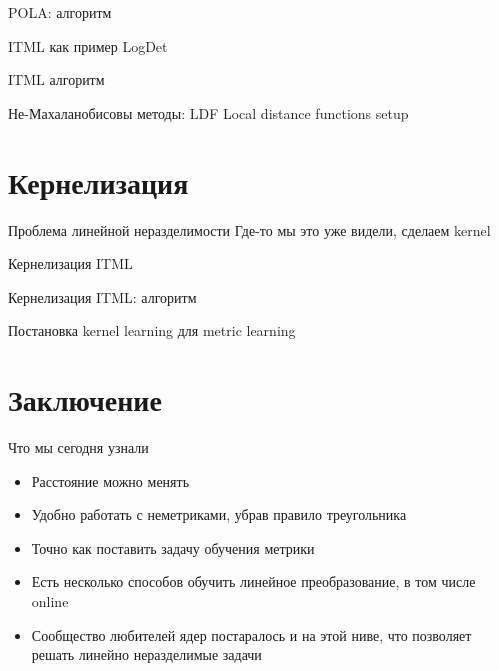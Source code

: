 \documentclass[14pt, fleqn, xcolor={dvipsnames, table}]{beamer}
\begin{document}
\begin{frame}{POLA: алгоритм}
\end{frame}


\begin{frame}{ITML как пример LogDet}
\end{frame}

\begin{frame}{ITML алгоритм}
\end{frame}

\begin{frame}{Не-Махаланобисовы методы: LDF}
Local distance functions setup
\end{frame}

\section{Кернелизация}
\begin{frame}{Проблема линейной неразделимости}
Где-то мы это уже видели, сделаем kernel
\end{frame}

\begin{frame}{Кернелизация ITML}
\end{frame}

\begin{frame}{Кернелизация ITML: алгоритм}
\end{frame}

\begin{frame}{Постановка kernel learning для metric learning}
\end{frame}

\section{Заключение}
\begin{frame}{Что мы сегодня узнали}
\begin{itemize}
  \item Расстояние можно менять
  \item Удобно работать с неметриками, убрав правило треугольника
  \item Точно как поставить задачу обучения метрики
  \item Есть несколько способов обучить линейное преобразование, в том числе online
  \item Сообщество любителей ядер постаралось и на этой ниве, что позволяет решать линейно неразделимые задачи
\end{itemize}
\end{frame}
\end{document}
